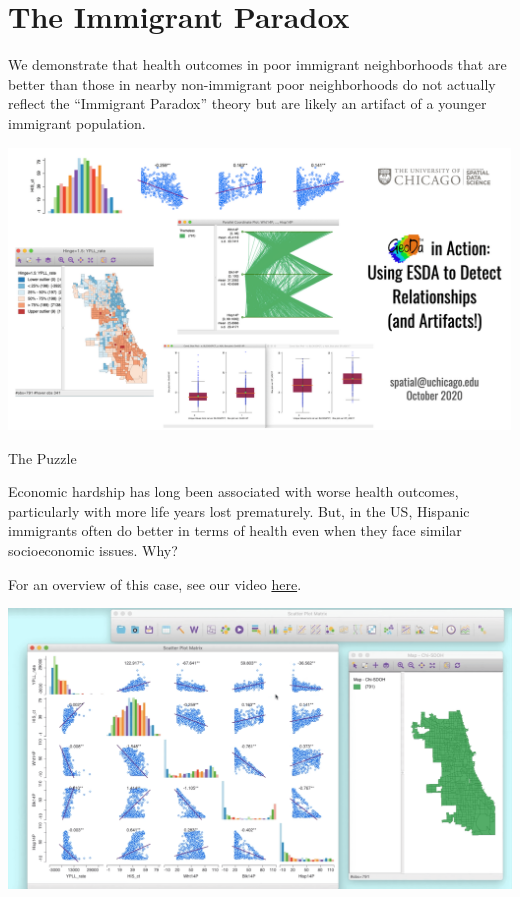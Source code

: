 \documentclass[
]{book}
\begin{document}
\hypertarget{the-immigrant-paradox}{%
\section{The Immigrant Paradox}\label{the-immigrant-paradox}}

We demonstrate that health outcomes in poor immigrant neighborhoods that are better than those in nearby non-immigrant poor neighborhoods do not actually reflect the ``Immigrant Paradox'' theory but are likely an artifact of a younger immigrant population.

\includegraphics{images/immigrant1.png}

The Puzzle

Economic hardship has long been associated with worse health outcomes, particularly with more life years lost prematurely. But, in the US, Hispanic immigrants often do better in terms of health even when they face similar socioeconomic issues. Why?

For an overview of this case, see our video \href{https://www.youtube.com/watch?v=sDjuZ1Ak9kQ\&t=44s}{here}.

\includegraphics{images/immigrant2.png}
\end{document}
